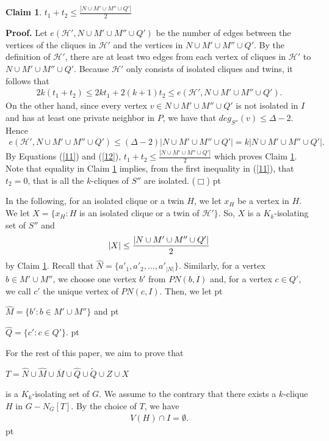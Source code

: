 \documentclass[11pt]{article}
\newtheorem{claim}{Claim}
\newcommand{\smallqed}{{\tiny ($\Box$)}}
\newcommand{\proof}{\noindent\textbf{Proof. }}
\newcommand{\2}{ \vspace{0.2cm} }
\newcommand{\1}{ \vspace{0.1cm} }
\begin{document}
\begin{claim}\label{c32}
$t_{1} + t_{2} \leq \frac{|N \cup M' \cup M'' \cup Q'|}{2}$
\end{claim}
\proof
Let $e(\mathcal{H}', N \cup M' \cup M'' \cup Q')$ be the number of edges between the vertices of the cliques in $\mathcal{H}'$ and the vertices in $N \cup M' \cup M'' \cup Q'$.
By the definition of $\mathcal{H}'$, there are at least two edges from each vertex of cliques in $\mathcal{H}'$ to $N \cup M' \cup M'' \cup Q'$. Because $\mathcal{H}'$ only consists of isolated cliques and twins, it follows that
\begin{align}\label{11}
  2k(t_{1} + t_{2}) \leq 2kt_{1} + 2(k + 1)t_{2} \leq e(\mathcal{H}', N \cup M' \cup M'' \cup Q').
\end{align}
\indent On the other hand, since every vertex $v \in N \cup M' \cup M'' \cup Q'$ is not isolated in $I$ and has at least one private neighbor in $P$, we have that $deg_{S''}(v) \leq \Delta -2.$ Hence
\begin{align}\label{12}
  e(\mathcal{H}', N \cup M' \cup M'' \cup Q') \leq (\Delta - 2)|N \cup M' \cup M'' \cup Q'| =k|N \cup M' \cup M'' \cup Q'|.
\end{align}
\noindent By Equations (\ref{11}) and (\ref{12}), $t_{1} + t_{2} \leq \frac{|N \cup M' \cup M'' \cup Q'|}{2}$ which proves Claim \ref{c32}. Note that equality in Claim \ref{c32} implies, from the first  inequality in (\ref{11}), that $t_2=0$, that is all the $k$-cliques of $S''$ are isolated.
\smallqed
{} pt

\indent In the following, for an isolated clique or a twin $H$, we let $x_{H}$ be a vertex in $H$. We let $X = \{x_{H} : H$ is an isolated clique or a twin of $\mathcal{H'}\}$. So, $X$ is a $K_k$-isolating set of $S''$ and
\begin{align}
|X| \leq \frac{|N \cup M' \cup M'' \cup Q'|}{2}\notag
\end{align}
\noindent by Claim \ref{c32}. Recall that $\hat{N} = \{a'_{1}, a'_{2}, ..., a'_{|N|}\}$. Similarly, for a vertex $b \in M' \cup M''$, we choose one vertex $b'$ from $PN(b, I)$ and, for a vertex $c \in Q'$, we call $c'$ the unique vertex of $PN(c, I)$. Then, we let
 pt

\indent $\hat{M} = \{b' : b \in M' \cup M''\}$ and
 pt

\indent $\hat{Q} = \{c' : c \in Q'\}$.
 pt

\indent For the rest of this paper, we aim to prove that
\begin{center}
  $T = \hat{N} \cup \hat{M} \cup \overline{M} \cup \hat{Q} \cup \tilde{Q} \cup Z \cup X$
\end{center}
\noindent is a $K_{k}$-isolating set of $G$. We assume to the contrary that there exists a $k$-clique $H$ in $G - N_{G}[T]$. By the choice of $T$, we have
\begin{align}\label{e1}
V(H) \cap I = \emptyset.
\end{align}
 pt
\end{document}
